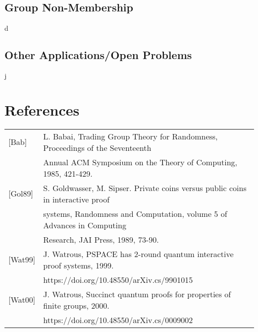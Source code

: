 \documentclass[12pt]{article}
\begin{document}
    \subsection{Group Non-Membership}d
    \subsection{Other Applications/Open Problems}j
	
	\newpage	
	\section*{References}
	\begin{tabular}{ l l }
		\label{bab}[Bab] & L. Babai, Trading Group Theory for Randomness, Proceedings of the Seventeenth\\& Annual ACM
		Symposium on the Theory of Computing, 1985, 421-429.\\
		\label{gol89}[Gol89] & S. Goldwasser, M. Sipser. Private coins versus public coins in interactive proof \\& systems, Randomness and Computation, volume 5 of Advances in Computing\\& Research, JAI Press, 1989, 73-90.\\
		\label{wat99}[Wat99] & J. Watrous, PSPACE has 2-round quantum interactive proof systems, 1999. \\&https://doi.org/10.48550/arXiv.cs/9901015\\
		\label{wat00}[Wat00] & J. Watrous, Succinct quantum proofs for properties of finite groups, 2000. \\&https://doi.org/10.48550/arXiv.cs/0009002\\
	\end{tabular}
	
		
\end{document}
